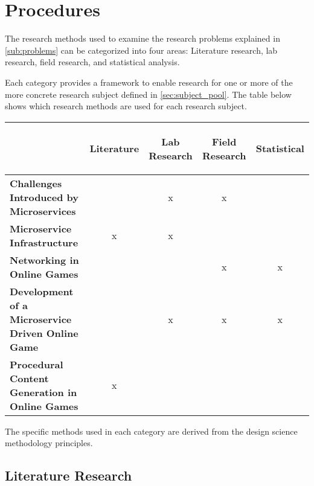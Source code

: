 \section{Procedures}

The research methods used to examine the research problems explained in
\autoref{sub:problems} can be categorized into four areas: Literature
research, lab research, field research, and statistical analysis.

Each category provides a framework to enable research for one or more of the
more concrete research subject defined in \autoref{sec:subject_pool}. The table
below shows which research methods are used for each research subject.

\begin{center}
  \begin{tabular}{ l | c | c | c | c | }
  
  	&\begin{turn}{90}\textbf{Literature}\end{turn}
  	&\begin{turn}{90}\textbf{Lab Research}\end{turn}
  	&\begin{turn}{90}\textbf{Field Research}\end{turn}
  	&\begin{turn}{90}\textbf{Statistical}\end{turn}
  	\\\hline
    
    
    \textbf{Challenges Introduced by Microservices}&&x&x&\\\hline
    \textbf{Microservice Infrastructure}&x&x&&\\\hline
    \textbf{Networking in Online Games}&&&x&x\\\hline
    \textbf{Development of a Microservice Driven Online Game}&&x&x&x\\\hline
    \textbf{Procedural Content Generation in Online Games}&x&&&\\\hline
  \end{tabular}
\end{center}

The specific methods used in each category are derived from the design
science methodology principles\cite{wieringa2014design_science}.

\subsection{Literature Research}

